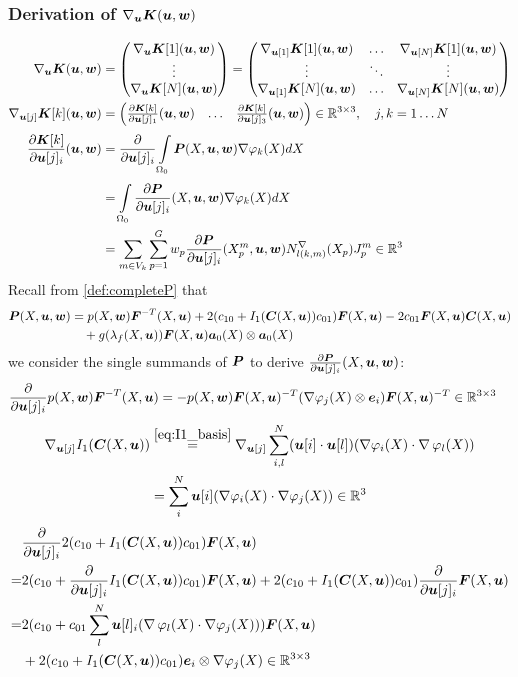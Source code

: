 \subsubsection{Derivation of $\nabla_{\vu}\vK(\vu,\vw)$}
\begin{align*}
	\nabla_{\vu}\vK(\vu,\vw) &= \m{\nabla_{\vu}\vK[1](\vu,\vw)\\ \vdots \\ \nabla_{\vu}\vK[N](\vu,\vw)}
	 = \m{\nabla_{\vu[1]}\vK[1](\vu,\vw) & \ldots & \nabla_{\vu[N]}\vK[1](\vu,\vw)\\
	 	\vdots & \ddots & \vdots\\
	   \nabla_{\vu[1]}\vK[N](\vu,\vw) & \ldots & \nabla_{\vu[N]}\vK[N](\vu,\vw)}\\
	\nabla_{\vu[j]}\vK[k](\vu,\vw) &=\m{\d{\vK[k]}{\vu[j]_1}(\vu,\vw) & \ldots & \d{\vK[k]}{\vu[j]_3}(\vu,\vw)}\in\R^{3\times 3},\quad j,k=1\ldots N\\
	\d{\vK[k]}{\vu[j]_i}(\vu,\vw) &= \d{}{\vu[j]_i} \intor\vP(X,\vu,\vw)\dpk dX\\
		&=  \intor\d{\vP}{\vu[j]_i}(X,\vu,\vw) \dpk dX\\
		&= \sumvk\sumgp w_p \d{\vP}{\vu[j]_i}(\pmp,\vu,\vw) \dNkmp\jmp\in\R^3
\end{align*}
Recall from \eqref{def:completeP} that
\begin{align*}
\vP(X,\vu,\vw) &= p(X,\vw)\vF^{-T}(X,\vu) + 2(c_{10} + I_1(\vC(X,\vu))c_{01})\vF(X,\vu) - 2c_{01}\vF(X,\vu)\vC(X,\vu)\\
	     &\quad+g(\lambda_f(X,\vu))\vF(X,\vu)\va_0(X)\otimes\va_0(X)
\end{align*}
we consider the single summands of $\vP$ to derive $\d{\vP}{\vu[j]_i}(X,\vu,\vw)$:
\begin{align*}
	 \d{}{\vu[j]_i}p(X,\vw)\vF^{-T}(X,\vu) &= -p(X,\vw)\vF(X,\vu)^{-T}(\dpj\otimes\ve_i)\vF(X,\vu)^{-T}\in\R^{3\times 3}
\end{align*}
\begin{align*}
	\nabla_{\vu[j]}I_1(\vC(X,\vu)) &\re{eq:I1_basis} \nabla_{\vu[j]}\suml{i,l}{N} (\vu[i] \cdot \vu[l])(\dpi \cdot \divergence\varphi_l(X))\\
	&= \suml{i}{N} \vu[i](\dpi \cdot \dpj) \in\R^3
\end{align*}
\begin{align*}	 
	 &\d{}{\vu[j]_i}2(c_{10} + I_1(\vC(X,\vu))c_{01})\vF(X,\vu)\\
	 =& 2(c_{10} + \d{}{\vu[j]_i}I_1(\vC(X,\vu))c_{01})\vF(X,\vu) + 2(c_{10} + I_1(\vC(X,\vu))c_{01})\d{}{\vu[j]_i}\vF(X,\vu)\\
	 =& 2(c_{10} + c_{01}\suml{l}{N} \vu[l]_i(\divergence\varphi_l(X) \cdot \dpj))\vF(X,\vu)\\
	 &+ 2(c_{10} + I_1(\vC(X,\vu))c_{01})\ve_i\otimes\dpj\in\R^{3\times 3}
\end{align*}

